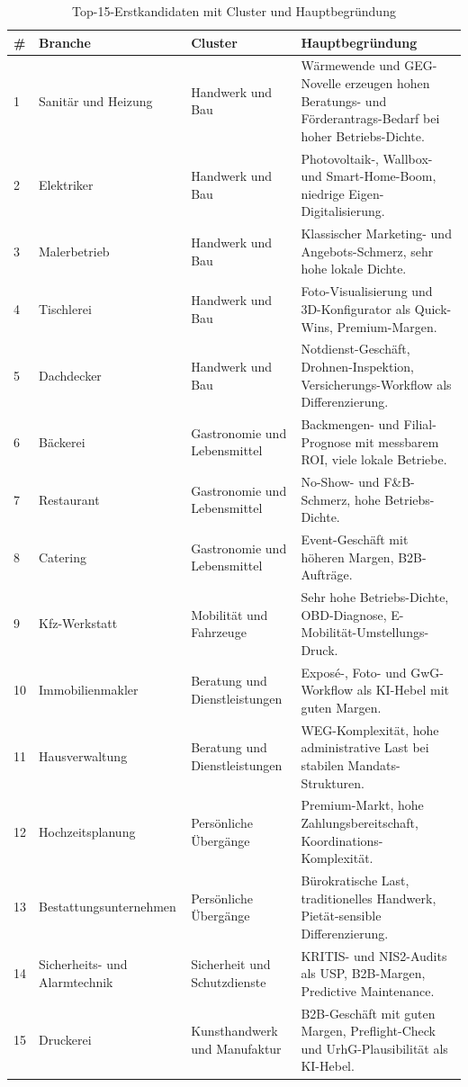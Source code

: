 \documentclass[a4paper,11pt]{article}
\begin{document}
\begin{table}[H]
\centering
\caption{Top-15-Erstkandidaten mit Cluster und Hauptbegründung}
\label{tab:top15}
\small
\begin{tabular}{p{0.5cm}p{3.2cm}p{3cm}p{7.3cm}}
\toprule
\textbf{\#} & \textbf{Branche} & \textbf{Cluster} & \textbf{Hauptbegründung} \\
\midrule
1 & Sanitär und Heizung & Handwerk und Bau & Wärmewende und GEG-Novelle erzeugen hohen Beratungs- und Förderantrags-Bedarf bei hoher Betriebs-Dichte. \\
2 & Elektriker & Handwerk und Bau & Photovoltaik-, Wallbox- und Smart-Home-Boom, niedrige Eigen-Digitalisierung. \\
3 & Malerbetrieb & Handwerk und Bau & Klassischer Marketing- und Angebots-Schmerz, sehr hohe lokale Dichte. \\
4 & Tischlerei & Handwerk und Bau & Foto-Visualisierung und 3D-Konfigurator als Quick-Wins, Premium-Margen. \\
5 & Dachdecker & Handwerk und Bau & Notdienst-Geschäft, Drohnen-Inspektion, Versicherungs-Workflow als Differenzierung. \\
6 & Bäckerei & Gastronomie und Lebensmittel & Backmengen- und Filial-Prognose mit messbarem ROI, viele lokale Betriebe. \\
7 & Restaurant & Gastronomie und Lebensmittel & No-Show- und F\&B-Schmerz, hohe Betriebs-Dichte. \\
8 & Catering & Gastronomie und Lebensmittel & Event-Geschäft mit höheren Margen, B2B-Aufträge. \\
9 & Kfz-Werkstatt & Mobilität und Fahrzeuge & Sehr hohe Betriebs-Dichte, OBD-Diagnose, E-Mobilität-Umstellungs-Druck. \\
10 & Immobilienmakler & Beratung und Dienstleistungen & Exposé-, Foto- und GwG-Workflow als KI-Hebel mit guten Margen. \\
11 & Hausverwaltung & Beratung und Dienstleistungen & WEG-Komplexität, hohe administrative Last bei stabilen Mandats-Strukturen. \\
12 & Hochzeitsplanung & Persönliche Übergänge & Premium-Markt, hohe Zahlungsbereitschaft, Koordinations-Komplexität. \\
13 & Bestattungsunternehmen & Persönliche Übergänge & Bürokratische Last, traditionelles Handwerk, Pietät-sensible Differenzierung. \\
14 & Sicherheits- und Alarmtechnik & Sicherheit und Schutzdienste & KRITIS- und NIS2-Audits als USP, B2B-Margen, Predictive Maintenance. \\
15 & Druckerei & Kunsthandwerk und Manufaktur & B2B-Geschäft mit guten Margen, Preflight-Check und UrhG-Plausibilität als KI-Hebel. \\
\bottomrule
\end{tabular}
\end{table}
\end{document}
